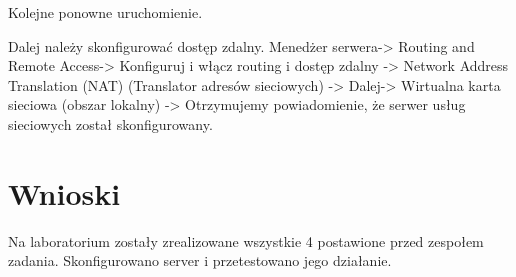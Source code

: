 \documentclass[a4paper,twoside,12pt]{mgr}
\begin{document}
Kolejne ponowne uruchomienie.

Dalej należy skonfigurować dostęp zdalny.
Menedżer serwera-> Routing and Remote Access-> Konfiguruj i włącz routing i dostęp zdalny -> Network Address Translation (NAT) (Translator adresów sieciowych) -> Dalej-> Wirtualna karta sieciowa (obszar lokalny) -> Otrzymujemy powiadomienie, że serwer usług sieciowych został skonfigurowany.

\chapter{Wnioski}
Na laboratorium zostały zrealizowane wszystkie 4 postawione przed zespołem zadania. Skonfigurowano server i przetestowano jego działanie.
\end{document}
